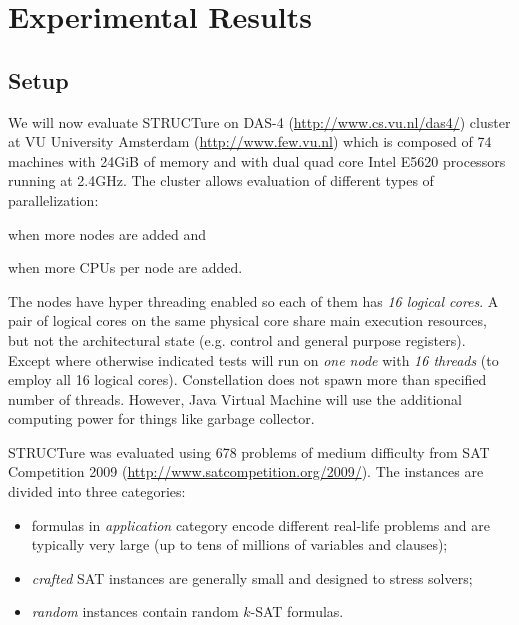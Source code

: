 \chapter{Experimental Results}
\label{chap:results}

\newcommand{\plot}[1]{
  \subfigure{
    \texttt{[image: data/all/\#1]}
  }

  \subfigure{
    \texttt{[image: data/random/\#1]}
  }

  \subfigure{
    \texttt{[image: data/nonrandom/\#1]}
  }
}

\section{Setup}

We will now evaluate STRUCTure on DAS-4 (\url{http://www.cs.vu.nl/das4/})
cluster at VU University Amsterdam (\url{http://www.few.vu.nl})
which is composed of 74 machines with 24GiB of memory and with
dual quad core Intel E5620 processors running at 2.4GHz. The
cluster allows evaluation of different types of parallelization:
\begin{inparaenum}[1)]
  \item when more nodes are added and
  \item when more CPUs per node are added.
\end{inparaenum}

The nodes have hyper threading enabled so each of them has \emph{16
logical cores}. A pair of logical cores on the same physical core
share main execution resources, but not the architectural state
(e.g. control and general purpose registers).  Except where otherwise
indicated tests will run on \emph{one node} with \emph{16 threads}
(to employ all 16 logical cores). Constellation does not spawn more
than specified number of threads. However, Java Virtual Machine will
use the additional computing power for things like garbage collector.

STRUCTure was evaluated using 678 problems
of medium difficulty from SAT Competition 2009
(\url{http://www.satcompetition.org/2009/}). The instances are
divided into three categories:
\begin{itemize}
  \item formulas in \emph{application} category encode different
  real-life problems and are typically very large (up to tens of
  millions of variables and clauses);
  \item \emph{crafted} SAT instances are generally small and designed
  to stress solvers;
  \item \emph{random} instances contain random $k$-SAT formulas.
\end{itemize}

